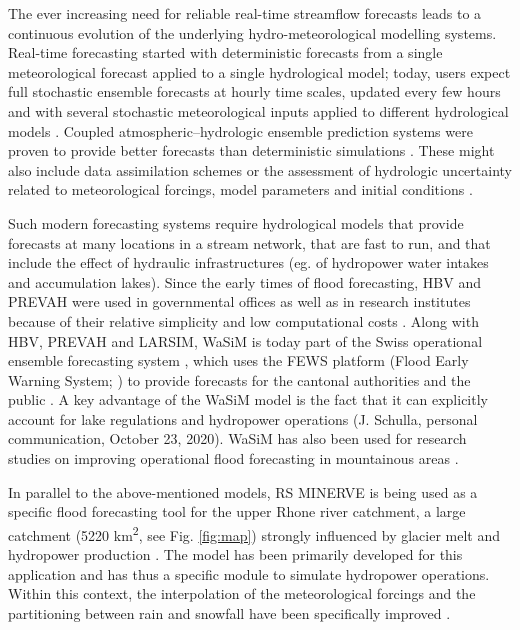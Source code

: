 \documentclass[10pt,a4paper]{article}
\begin{document}
The ever increasing need for reliable real-time streamflow forecasts leads to a continuous evolution of the underlying hydro-meteorological modelling systems. Real-time forecasting started with deterministic forecasts from a single meteorological forecast applied to a single hydrological model; today, users expect full stochastic ensemble forecasts at hourly time scales, updated every few hours and with several stochastic meteorological inputs applied to different hydrological models \citep{Jasper2016}. Coupled atmospheric--hydrologic ensemble prediction systems were proven to provide better forecasts than deterministic simulations \citep{Verbunt2007, Zappa2008, Jaun2008, Liechti2013}. These might also include data assimilation schemes \citep{Jorg-Hess2015a} or the assessment of hydrologic uncertainty related to meteorological forcings, model parameters and initial conditions \citep{Jaun2009, Zappa2011a, Fundel2011}.

Such modern forecasting systems require hydrological models that provide forecasts at many locations in a stream network, that are fast to run, and that include the effect of hydraulic infrastructures (eg. of hydropower water intakes and accumulation lakes). Since the early times of flood forecasting, HBV and PREVAH were used in governmental offices \citep{Jasper2016} as well as in research institutes because of their relative simplicity and low computational costs \citep{Verbunt2006, Addor_2011, Murphy_2019, Antonetti2019}. Along with HBV, PREVAH and LARSIM, WaSiM is today part of the Swiss operational ensemble forecasting system \citep{Jasper2016}, which uses the FEWS platform (Flood Early Warning System; \citealp{Werner_2013}) to provide forecasts for the cantonal authorities and the public \citep{FOEN2019}. A key advantage of the WaSiM model is the fact that it can explicitly account for lake regulations and hydropower operations (J. Schulla, personal communication, October 23, 2020). WaSiM has also been used for research studies on improving operational flood forecasting in mountainous areas \citep{Jasper2002, Jasper2003, Ahrens2003a, Ahrens2003b}.

In parallel to the above-mentioned models, RS MINERVE is being used as a specific flood forecasting tool for the upper Rhone river catchment, a large catchment (5220 km\textsuperscript{2}, see Fig. \ref{fig:map}) strongly influenced by glacier melt and hydropower production \citep{GarciaHernandez2009b, GarciaHernandez2009, Jordan2010}. The model has been primarily developed for this application and has thus a specific module to simulate hydropower operations. Within this context, the interpolation of the meteorological forcings and the partitioning between rain and snowfall have been specifically improved \citep{Tobin2011, Tobin2012}. 
\end{document}
